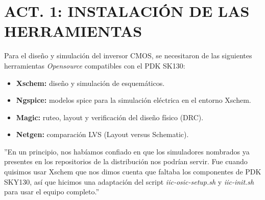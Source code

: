 \section{ACT. 1: INSTALACIÓN DE LAS HERRAMIENTAS}
\sangria{} Para el diseño y simulación del inversor CMOS, se necesitaron de las siguientes herramientas \textit{Opensource} compatibles con el PDK SK130: \begin{itemize} \item \textbf{Xschem:} diseño y simulación de esquemáticos. \item \textbf{Ngspice:} modelos spice para la simulación eléctrica en el entorno Xschem. \item \textbf{Magic:} ruteo, layout y verificación del diseño físico (DRC). \item \textbf{Netgen:} comparación LVS (Layout versus Schematic).  \end{itemize} 
\sangria{} ''En un principio, nos habíamos confiado en que los simuladores nombrados ya presentes en los repositorios de la distribución nos podrían servir. Fue cuando quisimos usar Xschem que nos dimos cuenta que faltaba los componentes de PDK SKY130, así que hicimos una adaptación del script \textit{iic-osic-setup.sh} y \textit{iic-init.sh} para usar el equipo completo.''
